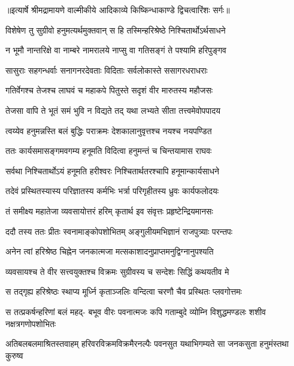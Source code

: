 {॥इत्यार्षे श्रीमद्रामायणे वाल्मीकीये आदिकाव्ये किष्किन्धाकाण्डे द्विचत्वारिंशः सर्गः॥}


\twolineshloka
{विशेषेण तु सुग्रीवो हनुमत्यर्थमुक्तवान्}
{स हि तस्मिन्हरिश्रेष्ठे निश्चितार्थोऽर्थसाधने} %

\twolineshloka
{न भूमौ नान्तरिक्षे वा नाम्बरे नामरालये}
{नाप्सु वा गतिसङ्गं ते पश्यामि हरिपुङ्गव} %

\twolineshloka
{सासुराः सहगन्धर्वाः सनागनरदेवताः}
{विदिताः सर्वलोकास्ते ससागरधराधराः} %

\twolineshloka
{गतिर्वेगश्च तेजश्च लाघवं च महाकपे}
{पितुस्ते सदृशं वीर मारुतस्य महौजसः} %

\twolineshloka
{तेजसा वापि ते भूतं समं भुवि न विद्यते}
{तद् यथा लभ्यते सीता तत्त्वमेवोपपादय} %

\twolineshloka
{त्वय्येव हनुमन्नस्ति बलं बुद्धिः पराक्रमः}
{देशकालानुवृत्तश्च नयश्च नयपण्डित} %

\twolineshloka
{ततः कार्यसमासङ्गमवगम्य हनूमति}
{विदित्वा हनुमन्तं च चिन्तयामास राघवः} %

\twolineshloka
{सर्वथा निश्चितार्थोऽयं हनूमति हरीश्वरः}
{निश्चितार्थतरश्चापि हनूमान्कार्यसाधने} %

\twolineshloka
{तदेवं प्रस्थितस्यास्य परिज्ञातस्य कर्मभिः}
{भर्त्रा परिगृहीतस्य ध्रुवः कार्यफलोदयः} %

\twolineshloka
{तं समीक्ष्य महातेजा व्यवसायोत्तरं हरिम्}
{कृतार्थ इव संवृत्तः प्रहृष्टेन्द्रियमानसः} %

\twolineshloka
{ददौ तस्य ततः प्रीतः स्वनामाङ्कोपशोभितम्}
{अङ्गुलीयमभिज्ञानं राजपुत्र्याः परन्तपः} %

\twolineshloka
{अनेन त्वां हरिश्रेष्ठ चिह्नेन जनकात्मजा}
{मत्सकाशादनुप्राप्तमनुद्विग्नानुपश्यति} %

\twolineshloka
{व्यवसायश्च ते वीर सत्त्वयुक्तश्च विक्रमः}
{सुग्रीवस्य च सन्देशः सिद्धिं कथयतीव मे} %

\twolineshloka
{स तद्गृह्य हरिश्रेष्ठः स्थाप्य मूर्ध्नि कृताञ्जलिः}
{वन्दित्वा चरणौ चैव प्रस्थितः प्लवगोत्तमः} %

\fourlineindentedshloka
{स तत्प्रकर्षन्हरिणां बलं महद्-}
{बभूव वीरः पवनात्मजः कपि}
{गताम्बुदे व्योम्नि विशुद्धमण्डलः}
{शशीव नक्षत्रगणोपशोभितः} %

\fourlineindentedshloka
{अतिबलबलमाश्रितस्तवाहम्}
{हरिवरविक्रमविक्रमैरनल्पैः}
{पवनसुत यथाभिगम्यते सा}
{जनकसुता हनुमंस्तथा कुरुष्व} %


